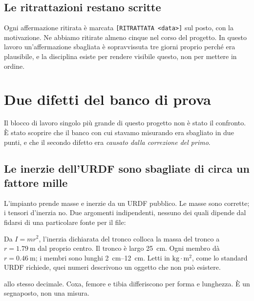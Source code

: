 \documentclass[11pt,a4paper]{article}
\begin{document}
\subsection{Le ritrattazioni restano scritte}

Ogni affermazione ritirata \`e marcata
\texttt{[RITRATTATA \textless data\textgreater]} sul posto, con la motivazione.
Ne abbiamo ritirate almeno cinque nel corso del progetto. In questo lavoro
un'affermazione sbagliata \`e sopravvissuta tre giorni proprio perch\'e era
plausibile, e la disciplina esiste per rendere visibile questo, non per
mettere in ordine.

\section{Due difetti del banco di prova}
\label{sec:defects}

Il blocco di lavoro singolo pi\`u grande di questo progetto non \`e stato il
confronto. \`E stato scoprire che il banco con cui stavamo misurando era
sbagliato in due punti, e che il secondo difetto era \emph{causato dalla
correzione del primo}.

\subsection{Le inerzie dell'URDF sono sbagliate di circa un fattore mille}
\label{sec:inertias}

L'impianto prende masse e inerzie da un URDF pubblico. Le masse sono corrette;
i tensori d'inerzia no. Due argomenti indipendenti, nessuno dei quali dipende
dal fidarsi di una particolare fonte per il file:

\begin{description}[style=nextline,leftmargin=10pt]
\item[Raggio d'inerzia.] Da $I = m r^2$, l'inerzia dichiarata del tronco
colloca la massa del tronco a $r = \SI{1.79}{\meter}$ dal proprio centro. Il
tronco \`e largo \SI{25}{\centi\meter}. Ogni membro d\`a
$r = \SI{0.46}{\meter}$; i membri sono lunghi \SIrange{2}{12}{\centi\meter}.
Letti in $\mathrm{kg}\cdot\mathrm{m}^2$, come lo standard URDF richiede, quei
numeri descrivono un oggetto che non pu\`o esistere.
\item[Tutti i 24 membri portano inerzia identica,] allo stesso decimale. Coxa,
femore e tibia differiscono per forma e lunghezza. \`E un segnaposto, non una
misura.
\end{description}
\end{document}
